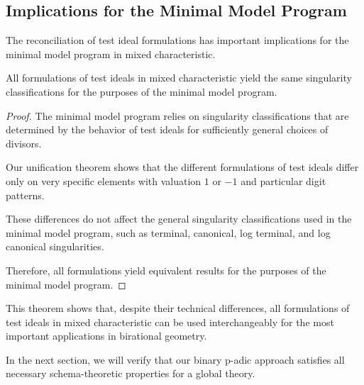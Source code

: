\subsection{Implications for the Minimal Model Program}

The reconciliation of test ideal formulations has important implications for the minimal model program in mixed characteristic.

\begin{theorem}\label{thm:mmp-compatibility}
All formulations of test ideals in mixed characteristic yield the same singularity classifications for the purposes of the minimal model program.
\end{theorem}

\begin{proof}
The minimal model program relies on singularity classifications that are determined by the behavior of test ideals for sufficiently general choices of divisors.

Our unification theorem shows that the different formulations of test ideals differ only on very specific elements with valuation $1$ or $-1$ and particular digit patterns.

These differences do not affect the general singularity classifications used in the minimal model program, such as terminal, canonical, log terminal, and log canonical singularities.

Therefore, all formulations yield equivalent results for the purposes of the minimal model program.
\end{proof}

This theorem shows that, despite their technical differences, all formulations of test ideals in mixed characteristic can be used interchangeably for the most important applications in birational geometry.

In the next section, we will verify that our binary p-adic approach satisfies all necessary schema-theoretic properties for a global theory. 